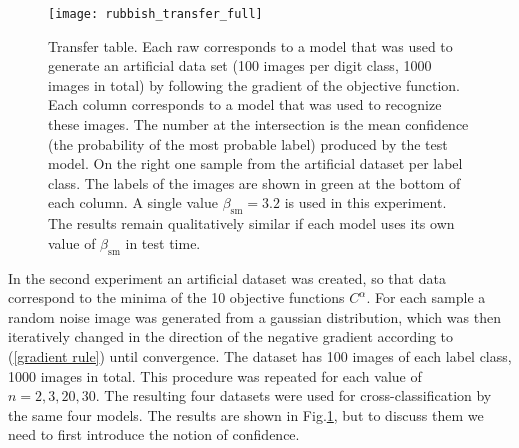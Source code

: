 \documentclass[12pt]{article} %
\begin{document}
\begin{figure}[h]
\begin{center}
\texttt{[image: rubbish\_transfer\_full]}
\end{center}
\caption{\footnotesize{Transfer table. Each raw corresponds to a model that was used to generate an artificial data set (100 images per digit class, 1000 images in total) by following the gradient of the objective function. Each column corresponds to a model that was used to recognize these images. The number at the intersection is the mean confidence (the probability of the most probable label) produced by the test model. On the right one sample from the artificial dataset per label class. The labels of the images are shown in green at the bottom of each column. A single value $\beta_{\text{sm}}=3.2$ is used in this experiment. The results remain qualitatively similar if each model uses its own value of $\beta_{\text{sm}}$ in test time.}}\label{transfer_table}
\end{figure}
In the second experiment an artificial dataset was created, so that data correspond to the minima of the 10  objective functions $C^\alpha$. For each sample a random noise image was generated from a gaussian distribution, which was then iteratively changed in the direction of the negative gradient according to (\ref{gradient rule}) until convergence. The dataset has 100 images of each label class, 1000 images in total. This procedure was repeated for each value of $n=2, 3, 20, 30$. The resulting four datasets were used for cross-classification by the same four models. The results are shown in Fig.\ref{transfer_table}, but to discuss them we need to first introduce the notion of confidence. 
\end{document}
